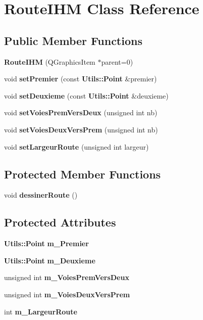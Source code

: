\section{\-Route\-I\-H\-M \-Class \-Reference}
\label{class_route_i_h_m}
\subsection*{\-Public \-Member \-Functions}
\begin{DoxyCompactItemize}
\item 
{\bf \-Route\-I\-H\-M} (\-Q\-Graphics\-Item $\ast$parent=0)
\item 
void {\bf set\-Premier} (const {\bf \-Utils\-::\-Point} \&premier)
\item 
void {\bf set\-Deuxieme} (const {\bf \-Utils\-::\-Point} \&deuxieme)
\item 
void {\bf set\-Voies\-Prem\-Vers\-Deux} (unsigned int nb)
\item 
void {\bf set\-Voies\-Deux\-Vers\-Prem} (unsigned int nb)
\item 
void {\bf set\-Largeur\-Route} (unsigned int largeur)
\end{DoxyCompactItemize}
\subsection*{\-Protected \-Member \-Functions}
\begin{DoxyCompactItemize}
\item 
void {\bf dessiner\-Route} ()
\end{DoxyCompactItemize}
\subsection*{\-Protected \-Attributes}
\begin{DoxyCompactItemize}
\item 
{\bf \-Utils\-::\-Point} {\bfseries m\-\_\-\-Premier}\label{class_route_i_h_m_add16a9552a9e2dc12bf92196cb946e02}

\item 
{\bf \-Utils\-::\-Point} {\bfseries m\-\_\-\-Deuxieme}\label{class_route_i_h_m_abf694f57e0c2f08d6c3afc62474b2663}

\item 
unsigned int {\bfseries m\-\_\-\-Voies\-Prem\-Vers\-Deux}\label{class_route_i_h_m_a1312ab879beea1727f62769dc54b3809}

\item 
unsigned int {\bfseries m\-\_\-\-Voies\-Deux\-Vers\-Prem}\label{class_route_i_h_m_a17492a2e6c4eef72472028557d780334}

\item 
int {\bfseries m\-\_\-\-Largeur\-Route}\label{class_route_i_h_m_a6cfa0882ea58c02db0c0204ea522d6b5}

\end{DoxyCompactItemize}


